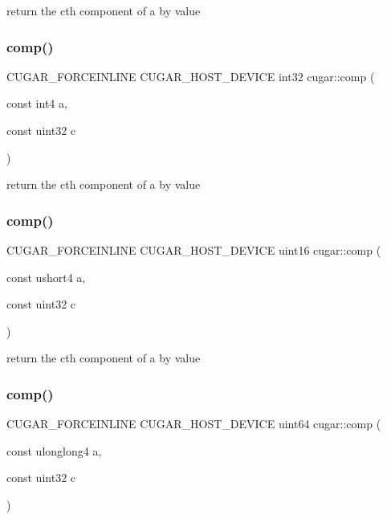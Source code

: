 return the c\textquotesingle{}th component of a by value \mbox{\label{group___basic_gaae11b617c4d4f21b97ed354dbe09d947}} 
\subsubsection{\texorpdfstring{comp()}{comp()}\hspace{0.1cm}{\footnotesize\ttfamily [9/11]}}
{\footnotesize\ttfamily C\+U\+G\+A\+R\+\_\+\+F\+O\+R\+C\+E\+I\+N\+L\+I\+NE C\+U\+G\+A\+R\+\_\+\+H\+O\+S\+T\+\_\+\+D\+E\+V\+I\+CE int32 cugar\+::comp (\begin{DoxyParamCaption}\item[{const int4}]{a,  }\item[{const uint32}]{c }\end{DoxyParamCaption})}

return the c\textquotesingle{}th component of a by value \mbox{\label{group___basic_ga2d4381782c0e35e5b62cad80edbadb97}} 
\subsubsection{\texorpdfstring{comp()}{comp()}\hspace{0.1cm}{\footnotesize\ttfamily [10/11]}}
{\footnotesize\ttfamily C\+U\+G\+A\+R\+\_\+\+F\+O\+R\+C\+E\+I\+N\+L\+I\+NE C\+U\+G\+A\+R\+\_\+\+H\+O\+S\+T\+\_\+\+D\+E\+V\+I\+CE uint16 cugar\+::comp (\begin{DoxyParamCaption}\item[{const ushort4}]{a,  }\item[{const uint32}]{c }\end{DoxyParamCaption})}

return the c\textquotesingle{}th component of a by value \mbox{\label{group___basic_ga47d97ac7d761e3b3764fedb8bab6ad8d}} 
\subsubsection{\texorpdfstring{comp()}{comp()}\hspace{0.1cm}{\footnotesize\ttfamily [11/11]}}
{\footnotesize\ttfamily C\+U\+G\+A\+R\+\_\+\+F\+O\+R\+C\+E\+I\+N\+L\+I\+NE C\+U\+G\+A\+R\+\_\+\+H\+O\+S\+T\+\_\+\+D\+E\+V\+I\+CE uint64 cugar\+::comp (\begin{DoxyParamCaption}\item[{const ulonglong4}]{a,  }\item[{const uint32}]{c }\end{DoxyParamCaption})}

